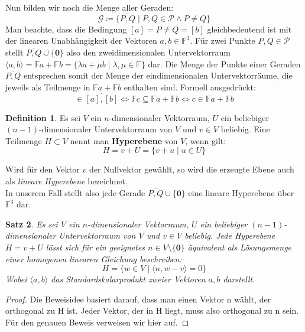 \documentclass[hidelinks]{article}
\theoremstyle{plain}
\newtheorem{thm}{Satz}[section]
\theoremstyle{definition}
\newtheorem{defn}[thm]{Definition}
\theoremstyle{rem}
\begin{document}
\begin{sloppypar}
Nun bilden wir noch die Menge aller Geraden:
\begin{equation*}
	\mathcal{G}\coloneqq\{\overline{P,Q}\mid P,Q\in\mathcal{P}\land P\ne Q\}
\end{equation*}
Man beachte, dass die Bedingung $[a]=P\ne Q=[b]$ gleichbedeutend ist mit der linearen Unabhängigkeit der Vektoren $a,b\in\mathbb{F}^3$. Für zwei Punkte $P,Q\in\mathcal{P}$ stellt $\overline{P,Q}\cup\{\boldsymbol 0\}$ also den zweidimensionalen Untervektorraum $\langle a,b\rangle=\mathbb{F}a+\mathbb{F}b=\{\lambda a+\mu b\mid \lambda,\mu\in\mathbb{F}\}$ dar. 
Die Menge der Punkte einer Geraden $\overline{P,Q}$ entsprechen somit der Menge der eindimensionalen Untervektorräume, die jeweils als Teilmenge in $\mathbb{F}a+\mathbb{F}b$ enthalten sind. Formell ausgedrückt:
\begin{equation*}
	[c]\in\overline{[a],[b]}\Leftrightarrow \mathbb{F}c\subseteq\mathbb{F}a+\mathbb{F}b\Leftrightarrow c\in\mathbb{F}a+\mathbb{F}b
\end{equation*}
\begin{defn}
	Es sei $V$ ein $n$-dimensionaler Vektorraum, $U$ ein beliebiger \mbox{$(n-1)$-dimensionaler} Untervektorraum von $V$ und $v\in V$ beliebig. Eine Teilmenge $H\subset V$ nennt man \textbf{Hyperebene} von $V$, wenn gilt:
\begin{equation*}
	H=v+U=\{v+u\mid u\in U\} 
\end{equation*}
\end{defn}
Wird für den Vektor $v$ der Nullvektor gewählt, so wird die erzeugte Ebene auch als \textit{lineare Hyperebene} bezeichnet.\\
In unserem Fall stellt also jede Gerade $\overline{P,Q}\cup\{\boldsymbol 0\}$ eine lineare Hyperebene über $\mathbb{F}^3$ dar.
\begin{thm}\label{hyperebene}
Es sei $V$ ein $n$-dimensionaler Vektorraum, $U$ ein beliebiger $(n-1)$-dimensionaler Untervektorraum von $V$ und $v\in V$ beliebig. 
Jede Hyperebene $H=v+U$ lässt sich für ein geeignetes $n\in V\setminus\{\boldsymbol 0\}$ äquivalent als Lösungsmenge einer homogenen linearen Gleichung beschreiben:
\begin{equation*}
	H=\{w\in V\mid \langle n,w-v\rangle=0\}
\end{equation*}
Wobei $\langle a,b\rangle$ das Standardskalarprodukt zweier Vektoren $a,b$ darstellt.
\end{thm}
\begin{proof}
	Die Beweisidee basiert darauf, dass man einen Vektor n wählt, der orthogonal zu H ist. Jeder Vektor, der in H liegt, muss also orthogonal zu n sein. Für den genauen Beweis verweisen wir hier auf\cite[Kapitel~8.1]{linalg}.

\end{proof}
\end{sloppypar}
\end{document}
